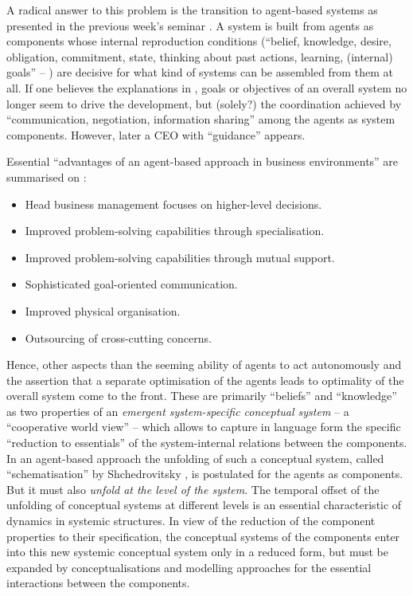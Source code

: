 \documentclass[11pt,a4paper]{article}
\begin{document}
A radical answer to this problem is the transition to agent-based systems as
presented in the previous week's seminar \cite{Haertel2021}. A system is built
from agents as components whose internal reproduction conditions
(\enquote{belief, knowledge, desire, obligation, commitment, state, thinking
  about past actions, learning, (internal) goals} --
\cite[slide~9]{Haertel2021}) are decisive for what kind of systems can be
assembled from them at all. If one believes the explanations in
\cite{Haertel2021}, goals or objectives of an overall system no longer seem to
drive the development, but (solely?) the coordination achieved by
\enquote{communication, negotiation, information sharing}
\cite[slide~34]{Haertel2021} among the agents as system components. However,
later \cite[slide~35]{Haertel2021} a CEO with \enquote{guidance} appears.

Essential \enquote{advantages of an agent-based approach in business
  environments} are summarised on \cite[slide~37]{Haertel2021}:
\begin{itemize}
\item Head business management focuses on higher-level decisions.
\item Improved problem-solving capabilities through specialisation.
\item Improved problem-solving capabilities through mutual support.
\item Sophisticated goal-oriented communication.
\item Improved physical organisation.
\item Outsourcing of cross-cutting concerns.
\end{itemize}

Hence, other aspects than the seeming ability of agents to act autonomously
and the assertion that a separate optimisation of the agents leads to
optimality of the overall system come to the front. These are primarily
\enquote{beliefs} and \enquote{knowledge} as two properties of an
\emph{emergent system-specific conceptual system} -- a \enquote{cooperative
  world view} -- which allows to capture in language form the specific
\enquote{reduction to essentials} of the system-internal relations between the
components. In an agent-based approach the unfolding of such a conceptual
system, called \enquote{schematisation} by Shchedrovitsky \cite{MSM}, is
postulated for the agents as components. But it must also \emph{unfold at the
  level of the system}. The temporal offset of the unfolding of conceptual
systems at different levels is an essential characteristic of dynamics in
systemic structures. In view of the reduction of the component properties to
their specification, the conceptual systems of the components enter into this
new systemic conceptual system only in a reduced form, but must be expanded by
conceptualisations and modelling approaches for the essential interactions
between the components.
\end{document}
